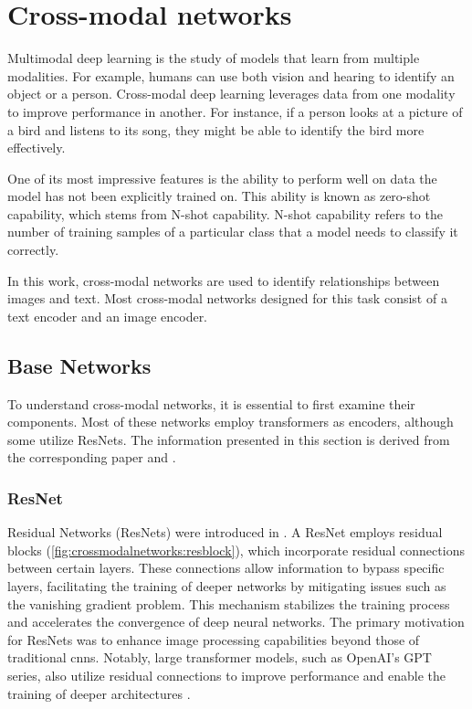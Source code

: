 %
%
%


\chapter{Cross-modal networks
    \label{chapter:crossmodalnetworks}}
    Multimodal deep learning is the study of models that learn from multiple modalities. 
    For example, humans can use both vision and hearing to identify an object or a person. 
    Cross-modal deep learning leverages data from one modality to improve performance in another. 
    For instance, if a person looks at a picture of a bird and listens to its song, they might be able to identify the bird more effectively.

    One of its most impressive features is the ability to perform well on data the model has not been explicitly trained on. 
    This ability is known as zero-shot capability, which stems from N-shot capability. 
    N-shot capability refers to the number of training samples of a particular class that a model needs to classify it correctly.

    In this work, cross-modal networks are used to identify relationships between images and text. 
    Most cross-modal networks designed for this task consist of a text encoder and an image encoder.

    \section{Base Networks}
    To understand cross-modal networks, it is essential to first examine their components. 
    Most of these networks employ transformers as encoders, although some utilize ResNets. 
    The information presented in this section is derived from the corresponding paper and \cite{clipexplain}.

    \subsection{ResNet
    \label{crossmodalnetworks:sec:resnet}}

    Residual Networks (ResNets) were introduced in \cite{resnetpaper}. 
    A ResNet employs residual blocks (\cref{fig:crossmodalnetworks:resblock}), which incorporate residual connections between certain layers. 
    These connections allow information to bypass specific layers, facilitating the training of deeper networks by mitigating issues such as the vanishing gradient problem. 
    This mechanism stabilizes the training process and accelerates the convergence of deep neural networks. 
    The primary motivation for ResNets was to enhance image processing capabilities beyond those of traditional \acrfull{cnn}s. 
    Notably, large transformer models, such as OpenAI's GPT series, also utilize residual connections to improve performance and enable the training of deeper architectures \cite{attentionisallyouneed}.
    
